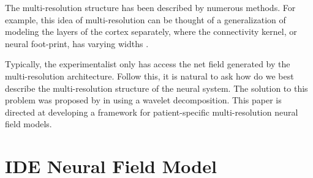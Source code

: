 \documentclass[review,authoryear,3p]{elsarticle}
\begin{document}
The multi-resolution structure has been described by numerous methods. For example, this idea of multi-resolution can be thought of a generalization of modeling the layers of the cortex separately, where the connectivity kernel, or neural foot-print, has varying widths \citep{Wilson1973}.

Typically, the experimentalist only has access the net field generated by the multi-resolution architecture. Follow this, it is natural to ask how do we best describe the multi-resolution structure of the neural system. The solution to this problem was proposed by \citet{Breakspear2005} in using a wavelet decomposition. This paper is directed at developing a framework for patient-specific multi-resolution neural field models. 

\section{IDE Neural Field Model}
\singlespacing
\end{document}
